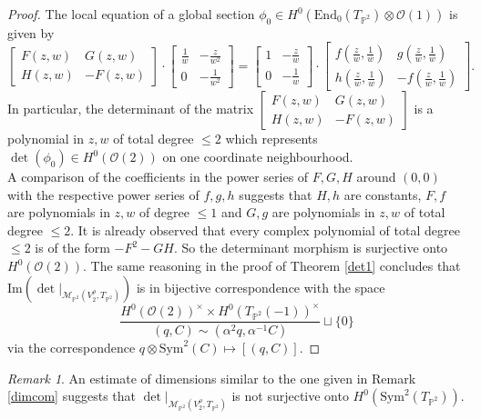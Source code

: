 \documentclass[12pt]{amsart}
\theoremstyle{definition}
\theoremstyle{remark}
\newtheorem{remark}[theorem]{Remark}
\numberwithin{equation}{section}
\begin{document}
\begin{proof}
The local equation of a global section $\phi_0\in H^0(\mbox{End}_0(T_{\mathbb{P}^2})\otimes\mathcal{O}(1))$ is given by 
\begin{equation}
\begin{bmatrix}
F(z, w) & G(z, w)\\
H(z, w) & -F(z, w)
\end{bmatrix}\cdot\begin{bmatrix}
\frac{1}{w} & -\frac{z}{w^2}\\
0 & -\frac{1}{w^2}
\end{bmatrix} = \begin{bmatrix}
1 & -\frac{z}{w}\\
0 & -\frac{1}{w}
\end{bmatrix}\cdot\begin{bmatrix}
f(\frac{z}{w}, \frac{1}{w}) & g(\frac{z}{w}, \frac{1}{w})\\
h(\frac{z}{w}, \frac{1}{w}) & -f(\frac{z}{w}, \frac{1}{w})
\end{bmatrix}.
\end{equation}
In particular, the determinant of the matrix $\begin{bmatrix}
F(z, w) & G(z, w)\\
H(z, w) & -F(z, w)
\end{bmatrix}$ is a polynomial in $z, w$ of total degree $\leq 2$ which represents $\det(\phi_0)\in H^0(\mathcal{O}(2))$ on one coordinate neighbourhood.\\



A comparison of the coefficients in the power series of $F, G, H$ around $(0,0)$ with the respective power series of $f, g, h$ suggests that $H, h$ are constants, $F, f$ are polynomials in $z, w$ of degree $\leq 1$ and $G, g$ are polynomials in $z, w$ of total degree $\leq 2$. It is already observed that every complex polynomial of total degree $\leq 2$ is of the form $-F^2 - GH$. So the determinant morphism is surjective onto $H^0(\mathcal{O}(2))$. The same reasoning in the proof of Theorem \ref{det1} concludes that  $\mbox{Im}\left(\det|_{\mathcal{M}_{\mathbb{P}^2}(V_2^\rho, T_{\mathbb{P}^2})}\right)$ is in bijective correspondence with the space $$\frac{H^0(\mathcal{O}(2))^\times\times H^0(T_{\mathbb{P}^2}(-1))^\times}{(q, C)\sim (\alpha^2q, \alpha^{-1}C)}\sqcup\{0\}$$ via the correspondence $q\otimes\mbox{Sym}^2(C)\mapsto [(q, C)]$.
\end{proof}



\begin{remark}
An estimate of dimensions similar to the one given in Remark \ref{dimcom} suggests that $\det|_{\mathcal{M}_{\mathbb{P}^2}(V_2^\rho, T_{\mathbb{P}^2})}$ is not surjective onto $H^0(\mbox{Sym}^2(T_{\mathbb{P}^2}))$.
\end{remark}
\end{document}
